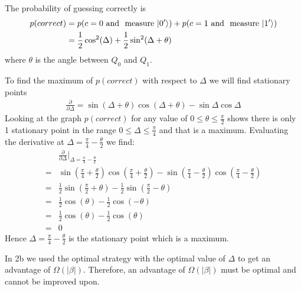 The probability of guessing correctly is 
\begin{align*}
    p(correct) &= p(c=0 \text{ and } \text{ measure } \lvert0'\rangle) + p(c=1 \text{ and } \text{ measure } \lvert1'\rangle)\\
    &=\frac{1}{2} \cos^2 (\Delta) + \frac{1}{2}\sin^2(\Delta + \theta) 
\end{align*}
where $\theta$ is the angle between $Q_0$ and $Q_1$.

To find the maximum of $p(correct)$ with respect to $\Delta$ we will find stationary points
\begin{align*}
    \frac{\partial }{\partial \Delta} = \sin (\Delta + \theta) \cos (\Delta + \theta) - \sin \Delta \cos \Delta
\end{align*}
Looking at the graph $p(correct)$ for any value of $0\leq\theta\leq\frac{\pi}{2}$ shows there is only 1 stationary point in the range $0\leq \Delta \leq \frac{\pi}{4}$ and that is a maximum.
Evaluating the derivative at $\Delta = \frac{\pi}{4} - \frac{\theta}{2}$ we find:
\begin{align*}
    &\frac{\partial }{\partial \Delta}\Bigr\rvert_{\Delta = \frac{\pi}{4} - \frac{\theta}{2}}\\
    =& \sin (\frac{\pi}{4} + \frac{\theta}{2} ) \cos (\frac{\pi}{4} + \frac{\theta}{2} ) - \sin(\frac{\pi}{4} - \frac{\theta}{2}) \cos(\frac{\pi}{4} - \frac{\theta}{2})\\
    =& \frac{1}{2}\sin (\frac{\pi}{2} + \theta ) - \frac{1}{2}\sin(\frac{\pi}{2} - \theta)\\
    =& \frac{1}{2}\cos (\theta ) - \frac{1}{2}\cos(- \theta)\\
    =& \frac{1}{2}\cos (\theta ) - \frac{1}{2}\cos( \theta)\\
    =& 0
\end{align*}
Hence $\Delta = \frac{\pi}{4} - \frac{\theta}{2}$ is the stationary point which is a maximum.

In 2b we used the optimal strategy with the optimal value of $\Delta$ to get an advantage of $\Omega(|\beta|)$.
Therefore, an advantage of $\Omega(|\beta|)$ must be optimal and cannot be improved upon.
